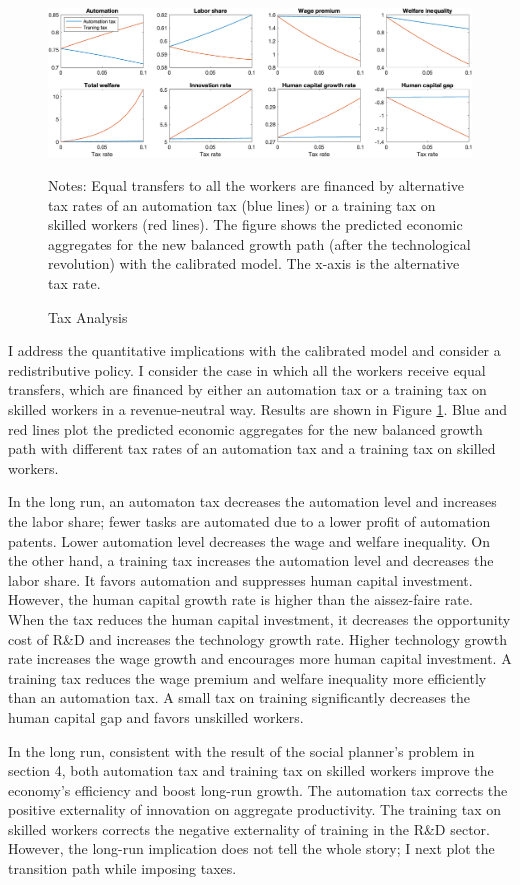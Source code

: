 \documentclass[12pt]{article}
\begin{document}
\begin{figure}[h!]
\includegraphics[width = \textwidth]{Tax}
\caption{Tax Analysis}
\label{tax}
{\scriptsize Notes: Equal transfers to all the workers are financed by alternative tax rates of an automation tax (blue lines) or a training tax on skilled workers (red lines). The figure shows the predicted economic aggregates for the new balanced growth path (after the technological revolution) with the calibrated model. The x-axis is the alternative tax rate. }
\end{figure}

I address the quantitative implications with the calibrated model and consider a redistributive policy. I consider the case in which all the workers receive equal transfers, which are financed by either an automation tax or a training tax on skilled workers in a revenue-neutral way. Results are shown in Figure \ref{tax}. Blue and red lines plot the predicted economic aggregates for the new balanced growth path with different tax rates of an automation tax and a training tax on skilled workers. 

In the long run, an automaton tax decreases the automation level and increases the labor share; fewer tasks are automated due to a lower profit of automation patents. Lower automation level decreases the wage and welfare inequality. On the other hand, a training tax increases the automation level and decreases the labor share. It favors automation and suppresses human capital investment. However, the human capital growth rate is higher than the aissez-faire rate. When the tax reduces the human capital investment, it decreases the opportunity cost of R\&D and increases the technology growth rate. Higher technology growth rate increases the wage growth and encourages more human capital investment. A training tax reduces the wage premium and welfare inequality more efficiently than an automation tax. A small tax on training significantly decreases the human capital gap and favors unskilled workers. 

In the long run, consistent with the result of the social planner's problem in section 4, both automation tax and training tax on skilled workers improve the economy's efficiency and boost long-run growth. The automation tax corrects the positive externality of innovation on aggregate productivity. The training tax on skilled workers corrects the negative externality of training in the R\&D sector. However, the long-run implication does not tell the whole story; I next plot the transition path while imposing taxes.  
\end{document}
